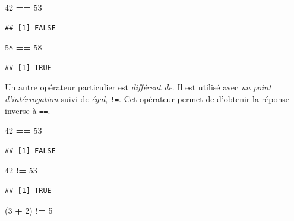 \documentclass[]{book}
\newenvironment{Shaded}{\begin{snugshade}}{\end{snugshade}}
\newcommand{\DecValTok}[1]{\textcolor[rgb]{0.00,0.00,0.81}{#1}}
\newcommand{\StringTok}[1]{\textcolor[rgb]{0.31,0.60,0.02}{#1}}
\newcommand{\OperatorTok}[1]{\textcolor[rgb]{0.81,0.36,0.00}{\textbf{#1}}}
\newcommand{\NormalTok}[1]{#1}
\begin{document}
\begin{Shaded}
\begin{Highlighting}[]
\DecValTok{42} \OperatorTok{==}\StringTok{ }\DecValTok{53}
\end{Highlighting}
\end{Shaded}

\begin{verbatim}
## [1] FALSE
\end{verbatim}

\begin{Shaded}
\begin{Highlighting}[]
\DecValTok{58} \OperatorTok{==}\StringTok{ }\DecValTok{58}
\end{Highlighting}
\end{Shaded}

\begin{verbatim}
## [1] TRUE
\end{verbatim}

Un autre opérateur particulier est \emph{différent de}. Il est utilisé
avec \emph{un point d'intérrogation} suivi de \emph{égal}, \texttt{!=}.
Cet opérateur permet de d'obtenir la réponse inverse à \texttt{==}.

\begin{Shaded}
\begin{Highlighting}[]
\DecValTok{42} \OperatorTok{==}\StringTok{ }\DecValTok{53}
\end{Highlighting}
\end{Shaded}

\begin{verbatim}
## [1] FALSE
\end{verbatim}

\begin{Shaded}
\begin{Highlighting}[]
\DecValTok{42} \OperatorTok{!=}\StringTok{ }\DecValTok{53}
\end{Highlighting}
\end{Shaded}

\begin{verbatim}
## [1] TRUE
\end{verbatim}

\begin{Shaded}
\begin{Highlighting}[]
\NormalTok{(}\DecValTok{3} \OperatorTok{+}\StringTok{ }\DecValTok{2}\NormalTok{) }\OperatorTok{!=}\StringTok{ }\DecValTok{5}
\end{Highlighting}
\end{Shaded}
\end{document}
